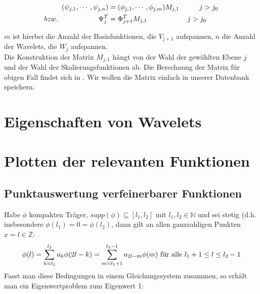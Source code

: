 \documentclass[11pt,a4paper,titlepage]{article}
\theoremstyle{plain} %
\theoremstyle{definition} %
\numberwithin{equation}{section} %
\begin{document}
	\begin{align}
		(\psi_{j,1},\cdots,\psi_{j,n})&=(\phi_{j,1},\cdots,\phi_{j,m})M_{j,1} \hspace*{1cm} j>j_0\\
		bzw. \hspace*{2cm} \Psi_j^T&=\Phi_{j+1}^T M_{j,1} \hspace*{2cm} j>j_0
	\end{align}
	
	$m$ ist hierbei die Anzahl der Basisfunktionen, die $V_{j+1}$ aufspannen, $n$ die Anzahl der Wavelets, die $W_j$ aufspannen. \\
	
	Die Konstruktion der Matrix $M_{j,1}$ hängt von der Wahl der gewählten Ebene $j$ und der Wahl der Skalierungsfunktionen ab. Die Berechnung der Matrix für obigen Fall findet sich in \cite{Primbs2006}. Wir wollen die Matrix einfach in unserer Datenbank speichern.
	\newpage
	\section{Eigenschaften von Wavelets}
	
	\section{Plotten der relevanten Funktionen}
	\subsection{Punktauswertung verfeinerbarer Funktionen}
	
	Habe $\phi$ kompakten Träger, $supp(\phi) \subseteq [l_1,l_2]$ mit $l_1, l_2 \in \mathbb{N}$ und sei stetig (d.h. insbesondere $\phi(l_1)=0=\phi(l_2)$, dann gilt an allen ganzzahligen Punkten $x=l \in \mathbb{Z}$:
	\begin{equation}
		\phi(l)=\sum_{k=l_1}^{l_2}a_k \phi(2l-k)=\sum_{m=l_1+1}^{l_2-1}a_{2l-m}\phi(m) \text{ für alle } l_1+1\leq l \leq l_2-1\\
	\end{equation}
	Fasst man diese Bedingungen in einem Gleichungssystem zusammen, so erhält man ein Eigenwertproblem zum Eigenwert 1:
	
\end{document}
